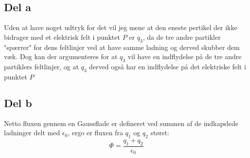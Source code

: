 \subsection{Del a} %
\label{sub:del_a}
Uden at have noget udtryk for det vil jeg mene at den eneste pertikel der ikke bidrager med et elektrisk felt i punktet $P$ er $q_3$, da de tre andre partikler "spærrer" for dens feltlinjer ved at have samme ladning og derved skubber dem væk. Dog kan der argumenteres for at $q_3$ vil have en indflydelse på de tre andre partiklers feltlinjer, og at $q_3$ derved også har en indflydelse på det elektriske felt i punktet $P$

\subsection{Del b} %
\label{sub:del_b}
Netto fluxen gennem en Gaussflade er defineret ved summen af de indkapslede ladninger delt med $\epsilon _0$, ergo er fluxen fra $q_1$ og $q_2$ størst:
\begin{equation}
	\Phi = \frac{q_1 + q_2}{\epsilon _0}
\end{equation}
